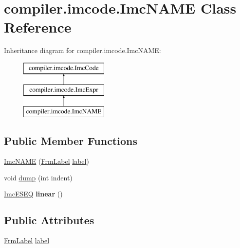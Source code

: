 \hypertarget{classcompiler_1_1imcode_1_1_imc_n_a_m_e}{}\section{compiler.\+imcode.\+Imc\+N\+A\+ME Class Reference}
\label{classcompiler_1_1imcode_1_1_imc_n_a_m_e}
Inheritance diagram for compiler.\+imcode.\+Imc\+N\+A\+ME\+:\begin{figure}[H]
\begin{center}
\leavevmode
\includegraphics[height=3.000000cm]{classcompiler_1_1imcode_1_1_imc_n_a_m_e}
\end{center}
\end{figure}
\subsection*{Public Member Functions}
\begin{DoxyCompactItemize}
\item 
\hyperlink{classcompiler_1_1imcode_1_1_imc_n_a_m_e_a86e0024212365d21856966cf44d314d0}{Imc\+N\+A\+ME} (\hyperlink{classcompiler_1_1frames_1_1_frm_label}{Frm\+Label} \hyperlink{classcompiler_1_1imcode_1_1_imc_n_a_m_e_a9f002a6e62a2da786fc8242a6e85f909}{label})
\item 
void \hyperlink{classcompiler_1_1imcode_1_1_imc_n_a_m_e_a3d2c4a326360dea3acbfa30611b66f9e}{dump} (int indent)
\item 
\mbox{\label{classcompiler_1_1imcode_1_1_imc_n_a_m_e_adbd6df5917856dba58960199891cd66c}} 
\hyperlink{classcompiler_1_1imcode_1_1_imc_e_s_e_q}{Imc\+E\+S\+EQ} {\bfseries linear} ()
\end{DoxyCompactItemize}
\subsection*{Public Attributes}
\begin{DoxyCompactItemize}
\item 
\hyperlink{classcompiler_1_1frames_1_1_frm_label}{Frm\+Label} \hyperlink{classcompiler_1_1imcode_1_1_imc_n_a_m_e_a9f002a6e62a2da786fc8242a6e85f909}{label}
\end{DoxyCompactItemize}


